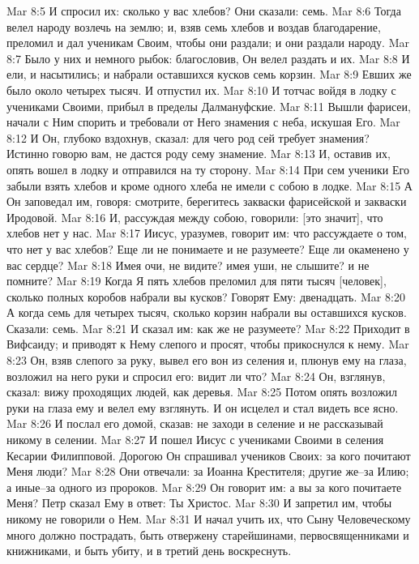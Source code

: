 Mar 8:5  И спросил их: сколько у вас хлебов? Они сказали: семь.
Mar 8:6  Тогда велел народу возлечь на землю; и, взяв семь хлебов и воздав благодарение, преломил и дал ученикам Своим, чтобы они раздали; и они раздали народу.
Mar 8:7  Было у них и немного рыбок: благословив, Он велел раздать и их.
Mar 8:8  И ели, и насытились; и набрали оставшихся кусков семь корзин.
Mar 8:9  Евших же было около четырех тысяч. И отпустил их.
Mar 8:10  И тотчас войдя в лодку с учениками Своими, прибыл в пределы Далмануфские.
Mar 8:11  Вышли фарисеи, начали с Ним спорить и требовали от Него знамения с неба, искушая Его.
Mar 8:12  И Он, глубоко вздохнув, сказал: для чего род сей требует знамения? Истинно говорю вам, не дастся роду сему знамение.
Mar 8:13  И, оставив их, опять вошел в лодку и отправился на ту сторону.
Mar 8:14  При сем ученики Его забыли взять хлебов и кроме одного хлеба не имели с собою в лодке.
Mar 8:15  А Он заповедал им, говоря: смотрите, берегитесь закваски фарисейской и закваски Иродовой.
Mar 8:16  И, рассуждая между собою, говорили: [это значит], что хлебов нет у нас.
Mar 8:17  Иисус, уразумев, говорит им: что рассуждаете о том, что нет у вас хлебов? Еще ли не понимаете и не разумеете? Еще ли окаменено у вас сердце?
Mar 8:18  Имея очи, не видите? имея уши, не слышите? и не помните?
Mar 8:19  Когда Я пять хлебов преломил для пяти тысяч [человек], сколько полных коробов набрали вы кусков? Говорят Ему: двенадцать.
Mar 8:20  А когда семь для четырех тысяч, сколько корзин набрали вы оставшихся кусков. Сказали: семь.
Mar 8:21  И сказал им: как же не разумеете?
Mar 8:22  Приходит в Вифсаиду; и приводят к Нему слепого и просят, чтобы прикоснулся к нему.
Mar 8:23  Он, взяв слепого за руку, вывел его вон из селения и, плюнув ему на глаза, возложил на него руки и спросил его: видит ли что?
Mar 8:24  Он, взглянув, сказал: вижу проходящих людей, как деревья.
Mar 8:25  Потом опять возложил руки на глаза ему и велел ему взглянуть. И он исцелел и стал видеть все ясно.
Mar 8:26  И послал его домой, сказав: не заходи в селение и не рассказывай никому в селении.
Mar 8:27  И пошел Иисус с учениками Своими в селения Кесарии Филипповой. Дорогою Он спрашивал учеников Своих: за кого почитают Меня люди?
Mar 8:28  Они отвечали: за Иоанна Крестителя; другие же--за Илию; а иные--за одного из пророков.
Mar 8:29  Он говорит им: а вы за кого почитаете Меня? Петр сказал Ему в ответ: Ты Христос.
Mar 8:30  И запретил им, чтобы никому не говорили о Нем.
Mar 8:31  И начал учить их, что Сыну Человеческому много должно пострадать, быть отвержену старейшинами, первосвященниками и книжниками, и быть убиту, и в третий день воскреснуть.
